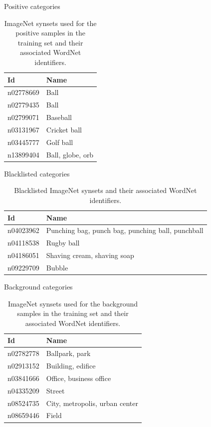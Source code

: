 \begin{frame}{Positive categories}
\begin{table}[t]
	\centering
	\caption{ImageNet synsets used for the positive samples in the training set and their associated WordNet identifiers.}
	\label{tab:positive_samples}
	\begin{tabularx}{1.0\columnwidth}{@{}lX@{}}
		\toprule
		\textbf{Id} & \textbf{Name} \\
		\midrule
			n02778669 & Ball \\
			n02779435 & Ball \\
			n02799071 & Baseball \\
			n03131967 & Cricket ball \\
			n03445777 & Golf ball \\
			n13899404 & Ball, globe, orb \\
		\bottomrule
	\end{tabularx}
\end{table}
\end{frame}

\begin{frame}{Blacklisted categories}
\begin{table}[h]
	\centering
	\caption{Blacklisted ImageNet synsets and their associated WordNet identifiers.}
	\label{tab:blacklisted_synsets}
	\begin{tabularx}{1.0\columnwidth}{@{}lX@{}}
	\toprule
	\textbf{Id} & \textbf{Name} \\
	\midrule
	n04023962 & Punching bag, punch bag, punching ball, punchball \\
	n04118538 & Rugby ball \\
	n04186051 & Shaving cream, shaving soap \\
	n09229709 & Bubble \\
	\bottomrule
	\end{tabularx}
\end{table}
\end{frame}

\begin{frame}{Background categories}
\begin{table}[t]
	\centering
	\caption{ImageNet synsets used for the background samples in the training set and their associated WordNet identifiers.}
		\label{tab:background_samples}
	\begin{tabularx}{1.0\columnwidth}{@{}lX@{}}
	\toprule
	\textbf{Id} & \textbf{Name} \\
	\midrule
	n02782778 & Ballpark, park \\
	n02913152 & Building, edifice \\
	n03841666 & Office, business office \\
	n04335209 & Street \\
	n08524735 & City, metropolis, urban center \\
	n08659446 & Field \\
	\bottomrule
	\end{tabularx}
\end{table}
\end{frame}

